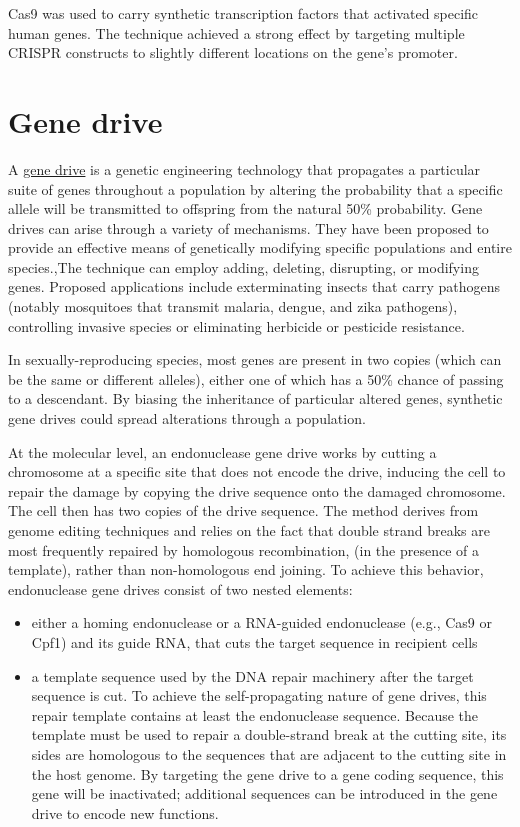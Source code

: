 Cas9 was used to carry synthetic transcription factors that activated specific human genes. The technique achieved a strong effect by targeting multiple CRISPR constructs to slightly different locations on the gene's promoter.

\hypertarget{gene-drive}{%
\section{Gene drive}\label{gene-drive}}

A \href{https://en.wikipedia.org/wiki/Gene_drive}{gene drive} is a genetic engineering technology that propagates a particular suite of genes throughout a population by altering the probability that a specific allele will be transmitted to offspring from the natural 50\% probability. Gene drives can arise through a variety of mechanisms. They have been proposed to provide an effective means of genetically modifying specific populations and entire species.,The technique can employ adding, deleting, disrupting, or modifying genes. Proposed applications include exterminating insects that carry pathogens (notably mosquitoes that transmit malaria, dengue, and zika pathogens), controlling invasive species or eliminating herbicide or pesticide resistance.

In sexually-reproducing species, most genes are present in two copies (which can be the same or different alleles), either one of which has a 50\% chance of passing to a descendant. By biasing the inheritance of particular altered genes, synthetic gene drives could spread alterations through a population.

At the molecular level, an endonuclease gene drive works by cutting a chromosome at a specific site that does not encode the drive, inducing the cell to repair the damage by copying the drive sequence onto the damaged chromosome. The cell then has two copies of the drive sequence. The method derives from genome editing techniques and relies on the fact that double strand breaks are most frequently repaired by homologous recombination, (in the presence of a template), rather than non-homologous end joining. To achieve this behavior, endonuclease gene drives consist of two nested elements:

\begin{itemize}
\tightlist
\item
  either a homing endonuclease or a RNA-guided endonuclease (e.g., Cas9 or Cpf1) and its guide RNA, that cuts the target sequence in recipient cells
\item
  a template sequence used by the DNA repair machinery after the target sequence is cut. To achieve the self-propagating nature of gene drives, this repair template contains at least the endonuclease sequence. Because the template must be used to repair a double-strand break at the cutting site, its sides are homologous to the sequences that are adjacent to the cutting site in the host genome. By targeting the gene drive to a gene coding sequence, this gene will be inactivated; additional sequences can be introduced in the gene drive to encode new functions.
\end{itemize}

